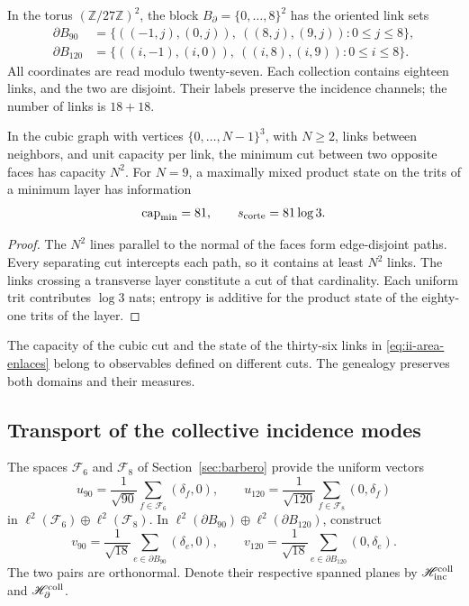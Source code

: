 In the torus \((\mathbb Z/27\mathbb Z)^2\), the block
\(B_\partial=\{0,\ldots,8\}^2\) has the oriented link sets
\begin{align}
 \partial B_{90}
 &=\{((-1,j),(0,j)),\ ((8,j),(9,j)):0\le j\le8\},\\
 \partial B_{120}
 &=\{((i,-1),(i,0)),\ ((i,8),(i,9)):0\le i\le8\}.
 \label{eq:ii-area-enlaces}
\end{align}
All coordinates are read modulo twenty-seven. Each collection contains
eighteen links, and the two are disjoint. Their labels preserve the
incidence channels; the number of links is \(18+18\).

\begin{theorem}
\label{thm:ii-area-corte-minimo}
In the cubic graph with vertices \(\{0,\ldots,N-1\}^3\), with
\(N\ge2\), links between neighbors, and unit capacity per link,
the minimum cut between two opposite faces has capacity \(N^2\).
For \(N=9\), a maximally mixed product state on the
trits of a minimum layer has information
\begin{equation}
 \operatorname{cap}_{\min}=81,\qquad s_{\rm corte}=81\log3.
 \label{eq:ii-area-corte-informacion}
\end{equation}
\end{theorem}
\begin{proof}
The \(N^2\) lines parallel to the normal of the faces form edge-disjoint
paths. Every separating cut intercepts each path, so
it contains at least \(N^2\) links. The links crossing
a transverse layer constitute a cut of that cardinality. Each uniform trit
contributes \(\log3\) nats; entropy is additive for the product
state of the eighty-one trits of the layer.
\end{proof}

The capacity of the cubic cut and the state of the thirty-six links
in \eqref{eq:ii-area-enlaces} belong to observables defined on
different cuts. The genealogy preserves both domains and their measures.

\subsection{Transport of the collective incidence modes}
\label{sec:ii-area-transporte-colectivo}

The spaces \(\mathcal F_6\) and \(\mathcal F_8\) of
Section~\ref{sec:barbero} provide the uniform vectors
\[
 u_{90}=\frac1{\sqrt{90}}\sum_{f\in\mathcal F_6}(\delta_f,0),
 \qquad
 u_{120}=\frac1{\sqrt{120}}\sum_{f\in\mathcal F_8}(0,\delta_f)
\]
in \(\ell^2(\mathcal F_6)\oplus\ell^2(\mathcal F_8)\).
In \(\ell^2(\partial B_{90})\oplus\ell^2(\partial B_{120})\),
construct
\[
 v_{90}=\frac1{\sqrt{18}}\sum_{e\in\partial B_{90}}(\delta_e,0),
 \qquad
 v_{120}=\frac1{\sqrt{18}}\sum_{e\in\partial B_{120}}(0,\delta_e).
\]
The two pairs are orthonormal. Denote their respective spanned planes
by \(\mathscr H_{\rm inc}^{\rm coll}\) and
\(\mathscr H_\partial^{\rm coll}\).

